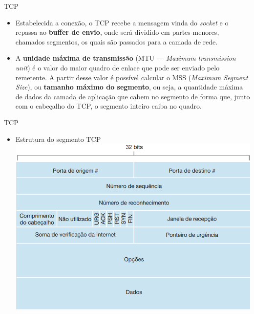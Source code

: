 \documentclass{libs/ufc_format}
\begin{document}
\begin{frame}{TCP}
    \begin{itemize}
        \justifying
        \item Estabelecida a conexão, o TCP recebe a mensagem vinda do \textit{socket} e o repassa ao \textbf{buffer de envio}, onde será dividido em partes menores, chamados segmentos, os quais são passados para a camada de rede.
        \item A \textbf{unidade máxima de transmissão} (MTU --- \textit{Maximum transmission unit}) é o valor do maior quadro de enlace que pode ser enviado pelo remetente. A partir desse valor é possível calcular o MSS (\textit{Maximum Segment Size}), ou \textbf{tamanho máximo do segmento}, ou seja, a quantidade máxima de dados da camada de aplicação que cabem no segmento de forma que, junto com o cabeçalho do TCP, o segmento inteiro caiba no quadro.
    \end{itemize}
\end{frame}

\begin{frame}{TCP}
    \begin{itemize}
        \item Estrutura do segmento TCP\\
        \centering
        \includegraphics[scale=0.48]{figuras/figura06_03}
    \end{itemize}
\end{frame}
\end{document}

